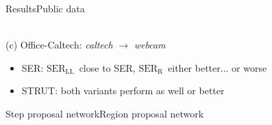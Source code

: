\documentclass[8pt,t,aspectratio=1610]{beamer}
\newcommand{\ratio}{0.5}
\newcommand{\serr}{$\text{SER}_{\text{R}}$}
\newcommand{\serll}{$\text{SER}_{\text{LL}}$}
\begin{document}
\begin{frame}[noframenumbering]{Results}{Public data}
\begin{minipage}[t]{0.329\linewidth}
\begin{minipage}[t]{\ratio\linewidth}
            \end{minipage}\\
            \medskip
            {\small(c)\; Office-Caltech: \emph{caltech} $\rightarrow$ \emph{webcam}}
        \end{minipage}
    
\begin{itemize}
    \item SER: \serll\ close to SER, \serr\ either better... or worse
    \item STRUT: both variants perform as well or better
\end{itemize}
\end{frame}

\begin{frame}[noframenumbering]{Step proposal network}{Region proposal network}

\begin{minipage}[t]{0.45\linewidth}\vspace{0pt}


\end{minipage}
\end{frame}
\end{document}
